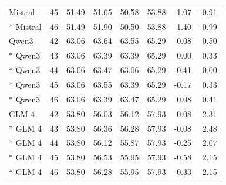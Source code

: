 {\begin{longtable}{lrrrrrrr}
Mistral & 45 & 51.49 & 51.65 & 50.58 & 53.88 & -1.07 & -0.91\\*
Mistral & 46 & 51.49 & 51.90 & 50.50 & 53.88 & -1.40 & -0.99\\
Qwen3 & 42 & 63.06 & 63.64 & 63.55 & 65.29 & -0.08 & 0.50\\*
Qwen3 & 43 & 63.06 & 63.39 & 63.39 & 65.29 & 0.00 & 0.33\\*
Qwen3 & 44 & 63.06 & 63.47 & 63.06 & 65.29 & -0.41 & 0.00\\*
Qwen3 & 45 & 63.06 & 63.55 & 63.39 & 65.29 & -0.17 & 0.33\\*
Qwen3 & 46 & 63.06 & 63.39 & 63.47 & 65.29 & 0.08 & 0.41\\
GLM 4 & 42 & 53.80 & 56.03 & 56.12 & 57.93 & 0.08 & 2.31\\*
GLM 4 & 43 & 53.80 & 56.36 & 56.28 & 57.93 & -0.08 & 2.48\\*
GLM 4 & 44 & 53.80 & 56.12 & 55.87 & 57.93 & -0.25 & 2.07\\*
GLM 4 & 45 & 53.80 & 56.53 & 55.95 & 57.93 & -0.58 & 2.15\\*
GLM 4 & 46 & 53.80 & 56.28 & 55.95 & 57.93 & -0.33 & 2.15\\
\end{longtable}}


